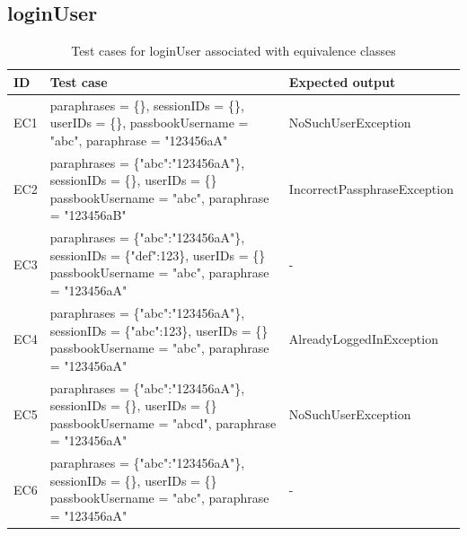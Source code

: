 \documentclass{article}
\begin{document}
\subsection{loginUser}

\begin{longtable}{|p{2cm}|p{7cm}|p{5cm}|}
\caption{Test cases for loginUser associated with equivalence classes}\\
\hline 
ID&Test case&Expected output\\
\hline  
EC1&paraphrases = \{\}, sessionIDs = \{\}, userIDs = \{\}, passbookUsername = "abc", paraphrase = "123456aA"&NoSuchUserException\\
\hline
EC2&paraphrases = \{"abc":"123456aA"\}, sessionIDs = \{\}, userIDs = \{\} passbookUsername = "abc", paraphrase = "123456aB"&IncorrectPassphraseException\\
\hline
EC3&paraphrases = \{"abc":"123456aA"\}, sessionIDs = \{"def":123\}, userIDs = \{\} passbookUsername = "abc", paraphrase = "123456aA"&-\\
\hline
EC4&paraphrases = \{"abc":"123456aA"\}, sessionIDs = \{"abc":123\}, userIDs = \{\} passbookUsername = "abc", paraphrase = "123456aA"&AlreadyLoggedInException\\
\hline
EC5&paraphrases = \{"abc":"123456aA"\}, sessionIDs = \{\}, userIDs = \{\} passbookUsername = "abcd", paraphrase = "123456aA"&NoSuchUserException\\
\hline
EC6&paraphrases = \{"abc":"123456aA"\}, sessionIDs = \{\}, userIDs = \{\} passbookUsername = "abc", paraphrase = "123456aA"&-\\
\hline
\end{longtable}

\end{document}
